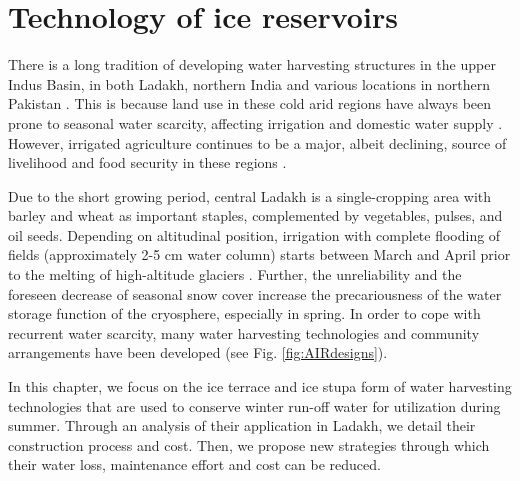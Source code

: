 \chapter{Technology of ice reservoirs}
\label{chap:tech}


There is a long tradition of developing water harvesting structures in the upper Indus Basin, in both Ladakh,
northern India \citep{labbalTraditionalOasesLadakh2000, nusserIrrigationDevelopmentUpper2012} and various
locations in northern Pakistan \citep{kreutzmannScarcityOpulenceWater2011}. This is because land use in these
cold arid regions have always been prone to seasonal water scarcity, affecting irrigation and domestic water
supply \citep{dameSTONGDEREVISITEDLANDUSE2010, nusserLocalKnowledgeGlobal2016}. However, irrigated agriculture
continues to be a major, albeit declining, source of livelihood and food security in these regions
\cite{dameFoodSecurityHigh2011}. 

Due to the short growing period, central Ladakh is a single-cropping area with barley and wheat as important
staples, complemented by vegetables, pulses, and oil seeds. Depending on altitudinal position, irrigation with
complete flooding of fields (approximately 2-5 cm water column) starts between March and April prior to the
melting of high-altitude glaciers \citep{nusserSociohydrologyArtificialGlaciers2019}. Further, the unreliability
and the foreseen decrease of seasonal snow cover \citep{chevuturiClimateChangeLeh2018} increase the precariousness of the water
storage function of the cryosphere, especially in spring. In order to cope with recurrent water scarcity, many
water harvesting technologies and community arrangements have been developed
\citep{nusserSociohydrologyArtificialGlaciers2019} (see Fig. \ref{fig:AIRdesigns}). 

In this chapter, we focus on the ice terrace and ice stupa form of water harvesting technologies that are used
to conserve winter run-off water for utilization during summer. Through an analysis of their application in
Ladakh, we detail their construction process and cost. Then, we propose new strategies through which their
water loss, maintenance effort and cost can be reduced.

